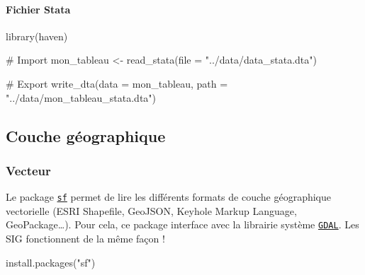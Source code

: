 \documentclass[
  letterpaper,
  DIV=11,
  numbers=noendperiod]{scrartcl}
\let\oldparagraph\paragraph
\renewcommand{\paragraph}[1]{\oldparagraph{#1}\mbox{}}
\newenvironment{Shaded}{\begin{snugshade}}{\end{snugshade}}
\newcommand{\AttributeTok}[1]{\textcolor[rgb]{0.40,0.45,0.13}{#1}}
\newcommand{\CommentTok}[1]{\textcolor[rgb]{0.37,0.37,0.37}{#1}}
\newcommand{\FunctionTok}[1]{\textcolor[rgb]{0.28,0.35,0.67}{#1}}
\newcommand{\NormalTok}[1]{\textcolor[rgb]{0.00,0.23,0.31}{#1}}
\newcommand{\OtherTok}[1]{\textcolor[rgb]{0.00,0.23,0.31}{#1}}
\newcommand{\StringTok}[1]{\textcolor[rgb]{0.13,0.47,0.30}{#1}}
\begin{document}
\hypertarget{fichier-stata}{%
\paragraph{Fichier Stata}\label{fichier-stata}}

\begin{Shaded}
\begin{Highlighting}[]
\FunctionTok{library}\NormalTok{(haven)}

\CommentTok{\# Import}
\NormalTok{mon\_tableau  }\OtherTok{\textless{}{-}} \FunctionTok{read\_stata}\NormalTok{(}\AttributeTok{file =}  \StringTok{"../data/data\_stata.dta"}\NormalTok{)}

\CommentTok{\# Export}
\FunctionTok{write\_dta}\NormalTok{(}\AttributeTok{data =}\NormalTok{ mon\_tableau, }\AttributeTok{path =}  \StringTok{"../data/mon\_tableau\_stata.dta"}\NormalTok{)}
\end{Highlighting}
\end{Shaded}

\hfill\break

\hypertarget{couche-guxe9ographique}{%
\subsection{\texorpdfstring{\textbf{Couche
géographique}}{Couche géographique}}\label{couche-guxe9ographique}}

\hypertarget{vecteur}{%
\subsubsection{Vecteur}\label{vecteur}}

Le package \href{https://r-spatial.github.io/sf/}{\texttt{sf}} permet de
lire les différents formats de couche géographique vectorielle (ESRI
Shapefile, GeoJSON, Keyhole Markup Language, GeoPackage\ldots). Pour
cela, ce package interface avec la librairie système
\href{https://gdal.org/}{\texttt{GDAL}}. Les SIG fonctionnent de la même
façon !

\begin{Shaded}
\begin{Highlighting}[]
\FunctionTok{install.packages}\NormalTok{(}\StringTok{"sf"}\NormalTok{)}
\end{Highlighting}
\end{Shaded}
\end{document}
